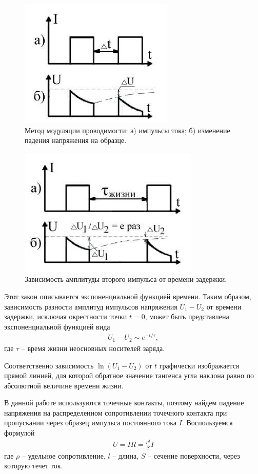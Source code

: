 \begin{figure}[H]
	\centering
	\includegraphics[]{img/9}
	\caption{Метод модуляции проводимости: а) импульсы тока; б) изменение падения напряжения на образце.}
	\label{fig:figure8}
\end{figure}

\begin{figure}[H]
	\centering
	\includegraphics[]{img/10}
	\caption{Зависимость амплитуды второго импульса от времени задержки.}
	\label{fig:figure9}
\end{figure}



Этот закон описывается экспоненциальной функцией времени. Таким образом, зависимость разности амплитуд импульсов напряжения  $U_1-U_2$ от времени задержки, исключая окрестности точки $t = 0$, может быть представлена экспоненциальной функцией вида
\begin{gather}
	\label{eq17}
	U_{1}-U_{2} \sim e^{-t/\tau},
\end{gather}
где $\tau$ -- время жизни неосновных носителей заряда.

Соответственно зависимость $\ln(U_1-U_2)$ от $t$ графически изображается прямой линией, для которой обратное значение тангенса угла наклона равно по абсолютной величине времени жизни.

В данной работе используются точечные контакты, поэтому найдем падение напряжения на распределенном сопротивлении точечного контакта при пропускании через образец импульса постоянного тока $I$. Воспользуемся формулой
\begin{gather}
	\label{eq18}
	U=I R=\frac{\rho l}{S} I
\end{gather}
где $\rho$ -- удельное сопротивление, $l$ -- длина, $S$ -- сечение поверхности, через которую течет ток. 

